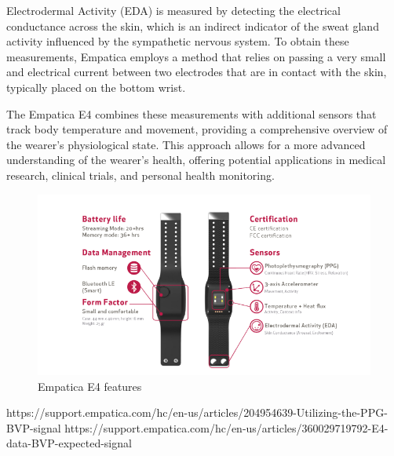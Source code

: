 Electrodermal Activity (EDA) is  measured  by detecting the electrical conductance across the skin, which is an indirect indicator of the sweat gland activity influenced by the sympathetic nervous system. To obtain these measurements, Empatica employs a method that relies on passing a very small and  electrical current between two electrodes that are in contact with the skin, typically placed on the bottom wrist.

The Empatica E4 combines these measurements with additional sensors that track body temperature and movement, providing a comprehensive overview of the wearer's physiological state. This approach allows for a more advanced understanding of the wearer's health, offering potential applications in medical research, clinical trials, and personal health monitoring.


\begin{figure}[hb]
	\centering
	\includegraphics[width=\columnwidth]{images/Empatica.png}
	\caption{Empatica E4 features \parencite{emp}}
	\label{fig:empatica}
\end{figure}


https://support.empatica.com/hc/en-us/articles/204954639-Utilizing-the-PPG-BVP-signal
https://support.empatica.com/hc/en-us/articles/360029719792-E4-data-BVP-expected-signal

